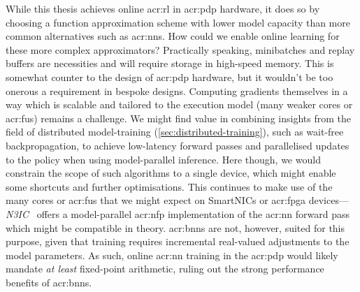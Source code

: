 
While this thesis achieves online \gls{acr:rl} in \gls{acr:pdp} hardware, it does so by choosing a function approximation scheme with lower model capacity than more common alternatives such as \glspl{acr:nn}.
How could we enable online learning for these more complex approximators?
Practically speaking, minibatches and replay buffers are necessities and will require storage in high-speed memory.
This is somewhat counter to the design of \gls{acr:pdp} hardware, but it wouldn't be too onerous a requirement in bespoke designs.
Computing gradients themselves in a way which is scalable and tailored to the execution model (many weaker cores or \glspl{acr:fu}) remains a challenge.
We might find value in combining insights from the field of distributed model-training (\cref{sec:distributed-training}), such as wait-free backpropagation, to achieve low-latency forward passes and parallelised updates to the policy when using model-parallel inference.
Here though, we would constrain the scope of such algorithms to a single device, which might enable some shortcuts and further optimisations.
This continues to make use of the many cores or \glspl{acr:fu} that we might expect on SmartNICs or \gls{acr:fpga} devices---\emph{N3IC}~\parencite{DBLP:journals/corr/abs-2009-02353} offers a model-parallel \gls{acr:nfp} implementation of the \gls{acr:nn} forward pass which might be compatible in theory.
\glspl{acr:bnn} are not, however, suited for this purpose, given that training requires incremental real-valued adjustments to the model parameters.
As such, online \gls{acr:nn} training in the \gls{acr:pdp} would likely mandate \emph{at least} fixed-point arithmetic, ruling out the strong performance benefits of \glspl{acr:bnn}.

